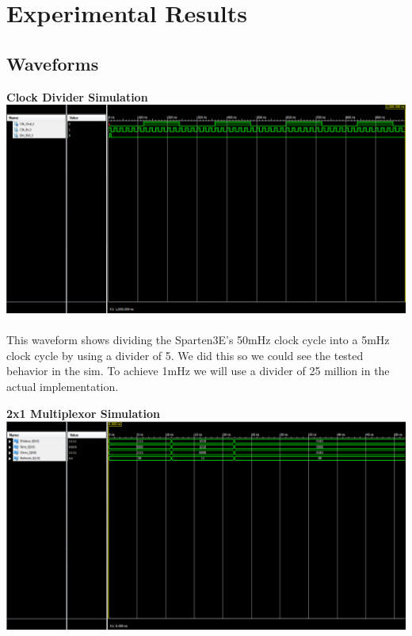 \documentclass[12pt]{report}
\begin{document}
		\paragraph*{}
			
\section*{Experimental Results}
	
	\subsection*{Waveforms}
		\vspace{1cm}
			\begin{center}
				\textbf{Clock Divider Simulation}
				\includegraphics[scale=.45]{cd.PNG}
			\end{center}
				\paragraph*{}
				This waveform shows dividing the Sparten3E's 50mHz clock cycle into a 5mHz clock cycle by using a divider of 5.  We did this so we could see the tested behavior in the sim.  To achieve 1mHz we will use a divider of 25 million in the actual implementation.
		
			\begin{center}
				\textbf{2x1 Multiplexor Simulation}
				\includegraphics[scale=.45]{mux.PNG}
			\end{center}
\end{document}
